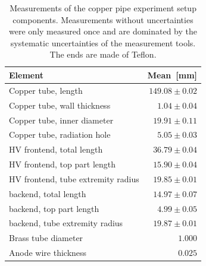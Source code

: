 \begin{table}[H]
	\begin{tabularx}{\linewidth}{p{4.5cm}r}
		\textbf{Element} & \textbf{Mean}~{[}mm{]}          \\ \hline
		Copper tube, length            & $149.08 \pm 0.02$ \\
		Copper tube, wall thickness    & $1.04 \pm 0.04$  \\
		Copper tube, inner diameter    & $19.91 \pm 0.11$  \\
		Copper tube, radiation hole    & $5.05 \pm 0.03$  \\
		HV frontend,  total length         & $36.79 \pm 0.04$  \\
		HV frontend, top part length       & $15.90 \pm 0.04$  \\
		HV frontend, tube extremity radius & $19.85 \pm 0.01$  \\
		backend, total length             & $14.97 \pm 0.07$  \\
		backend, top part length          & $4.99 \pm 0.05$  \\
		backend, tube extremity radius    & $19.87 \pm 0.01$  \\
		Brass tube diameter            & $1.000$           \\
		Anode wire thickness           & $0.025$           \\ \hline
	\end{tabularx}
\caption{Measurements of the copper pipe experiment setup components. Measurements without uncertainties were only measured once and are dominated by the systematic uncertainties of the measurement tools. The ends are made of Teflon.}
\label{Tab:coppercan_sizes}
\end{table}




















